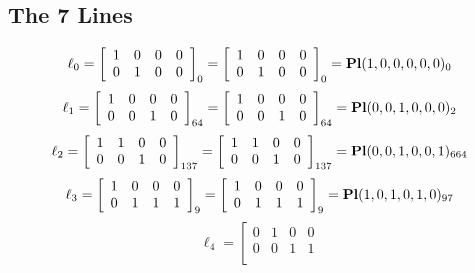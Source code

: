 \documentclass{article}
\begin{document}
{\subsection*{The 7 Lines}
$$
\ell_{0} = 
\left[
\begin{array}{*{4}{r}}
1 & 0 & 0 & 0\\
0 & 1 & 0 & 0\\
\end{array}
\right]
_{0}
=
\left[
\begin{array}{*{4}c}
1  & 0  & 0  & 0\\
0  & 1  & 0  & 0\\
\end{array}
\right]_{0}
={\rm\bf Pl}(1,0,0,0,0,0 )_{0}$$
$$
\ell_{1} = 
\left[
\begin{array}{*{4}{r}}
1 & 0 & 0 & 0\\
0 & 0 & 1 & 0\\
\end{array}
\right]
_{64}
=
\left[
\begin{array}{*{4}c}
1  & 0  & 0  & 0\\
0  & 0  & 1  & 0\\
\end{array}
\right]_{64}
={\rm\bf Pl}(0,0,1,0,0,0 )_{2}$$
$$
\ell_{2} = 
\left[
\begin{array}{*{4}{r}}
1 & 1 & 0 & 0\\
0 & 0 & 1 & 0\\
\end{array}
\right]
_{137}
=
\left[
\begin{array}{*{4}c}
1  & 1  & 0  & 0\\
0  & 0  & 1  & 0\\
\end{array}
\right]_{137}
={\rm\bf Pl}(0,0,1,0,0,1 )_{664}$$
$$
\ell_{3} = 
\left[
\begin{array}{*{4}{r}}
1 & 0 & 0 & 0\\
0 & 1 & 1 & 1\\
\end{array}
\right]
_{9}
=
\left[
\begin{array}{*{4}c}
1  & 0  & 0  & 0\\
0  & 1  & 1  & 1\\
\end{array}
\right]_{9}
={\rm\bf Pl}(1,0,1,0,1,0 )_{97}$$
$$
\ell_{4} = 
\left[
\begin{array}{*{4}{r}}
0 & 1 & 0 & 0\\
0 & 0 & 1 & 1\\
\end{array}
$$}
\end{document}
